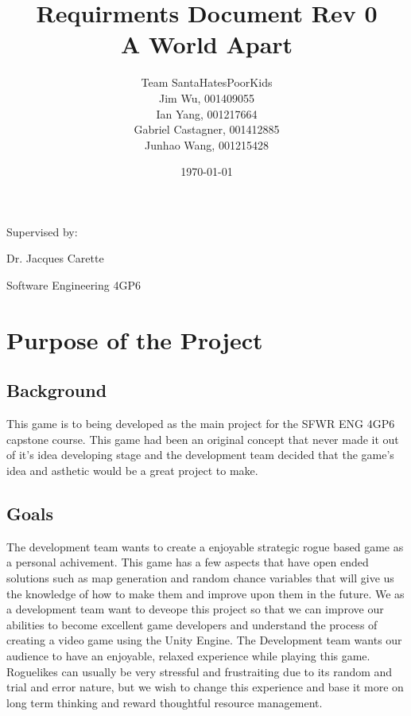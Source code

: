 \documentclass{article}
\title{Requirments Document Rev 0\\A World Apart}
\author{Team SantaHatesPoorKids
		\\ Jim Wu, 001409055
		\\ Ian Yang, 001217664
		\\ Gabriel Castagner, 001412885
		\\ Junhao Wang, 001215428
}
\date{\today}
\begin{document}
\begin{titlepage}
\maketitle
\vfill
{\centering
Supervised by:\par 
Dr. Jacques Carette \par
Software Engineering 4GP6 \par
}
\end{titlepage}
\tableofcontents
\newpage


\section{Purpose of the Project}
\subsection{Background}

\quad This game is to being developed as the main project for the SFWR ENG 4GP6 capstone course. This game had been an original concept that never made it out of it's idea developing stage and the development team decided that the game's idea and asthetic would be a great project to make.
\subsection{Goals}
\quad The development team wants to create a enjoyable strategic rogue based game as a personal achivement. This game has a few aspects that have open ended solutions such as map generation and random chance variables that will give us the knowledge of how to make them and improve upon them in the future. We as a development team want to deveope this project so that we can improve our abilities to become excellent game developers and understand the process of creating a video game using the Unity Engine. The Development team wants our audience to have an enjoyable, relaxed experience while playing this game. Roguelikes can usually be very stressful and frustraiting due to its random and trial and error nature, but we wish to change this experience and base it more on long term thinking and reward thoughtful resource management.
\end{document}
